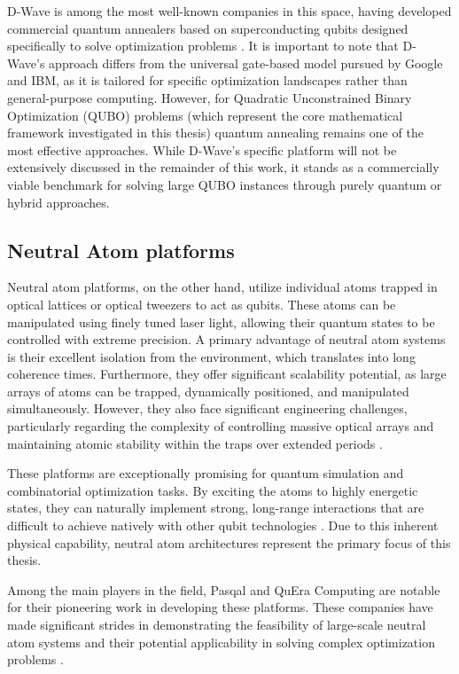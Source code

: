 D-Wave is among the most well-known companies in this space, having developed commercial quantum annealers based on superconducting qubits designed specifically to solve optimization problems \cite{mcgeoch2020dwaveReview}. It is important to note that D-Wave's approach differs from the universal gate-based model pursued by Google and IBM, as it is tailored for specific optimization landscapes rather than general-purpose computing. However, for Quadratic Unconstrained Binary Optimization (QUBO) problems (which represent the core mathematical framework investigated in this thesis) quantum annealing remains one of the most effective approaches. While D-Wave's specific platform will not be extensively discussed in the remainder of this work, it stands as a commercially viable benchmark for solving large QUBO instances through purely quantum or hybrid approaches.

\subsection{Neutral Atom platforms}

Neutral atom platforms, on the other hand, utilize individual atoms trapped in optical lattices or optical tweezers to act as qubits. These atoms can be manipulated using finely tuned laser light, allowing their quantum states to be controlled with extreme precision. A primary advantage of neutral atom systems is their excellent isolation from the environment, which translates into long coherence times. Furthermore, they offer significant scalability potential, as large arrays of atoms can be trapped, dynamically positioned, and manipulated simultaneously. However, they also face significant engineering challenges, particularly regarding the complexity of controlling massive optical arrays and maintaining atomic stability within the traps over extended periods \cite{Henriet2020quantumcomputing, quantumReport}.

These platforms are exceptionally promising for quantum simulation and combinatorial optimization tasks. By exciting the atoms to highly energetic states, they can naturally implement strong, long-range interactions that are difficult to achieve natively with other qubit technologies \cite{Henriet2020quantumcomputing}. Due to this inherent physical capability, neutral atom architectures represent the primary focus of this thesis. 

Among the main players in the field, Pasqal and QuEra Computing are notable for their pioneering work in developing these platforms. These companies have made significant strides in demonstrating the feasibility of large-scale neutral atom systems and their potential applicability in solving complex optimization problems \cite{ebadi2022quantum, Henriet2020quantumcomputing, quantumReport}.

